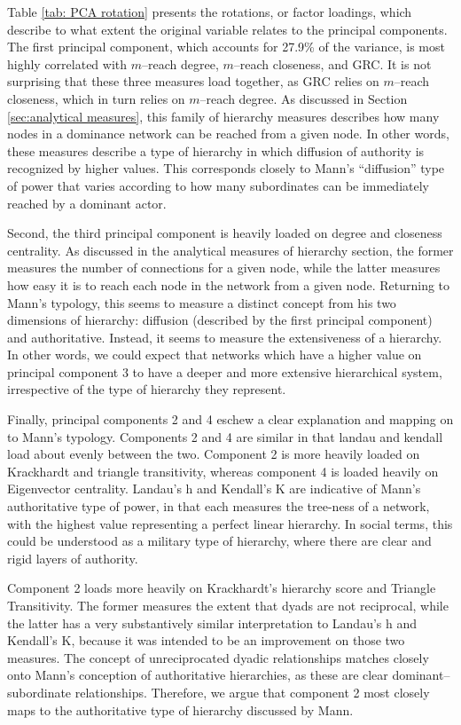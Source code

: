 \documentclass[3p,times]{elsarticle}
\begin{document}
Table \ref{tab: PCA rotation} presents the rotations, or factor loadings, which describe to what extent the original variable relates to the principal components. The first principal component, which accounts for 27.9\% of the variance, is most highly correlated with $m$--reach degree, $m$--reach closeness, and GRC. It is not surprising that these three measures load together, as GRC relies on $m$--reach closeness, which in turn relies on $m$--reach degree. As discussed in Section \ref{sec:analytical measures}, this family of hierarchy measures describes how many nodes in a dominance network can be reached from a given node. In other words, these measures describe a type of hierarchy in which diffusion of authority is recognized by higher values. This corresponds closely to Mann's ``diffusion'' type of power that varies according to how many subordinates can be immediately reached by a dominant actor.

Second, the third principal component is heavily loaded on degree and closeness centrality. As discussed in the analytical measures of hierarchy section, the former measures the number of connections for a given node, while the latter measures how easy it is to reach each node in the network from a given node. Returning to Mann's typology, this seems to measure a distinct concept from his two dimensions of hierarchy: diffusion (described by the first principal component) and authoritative. Instead, it seems to measure the extensiveness of a hierarchy. In other words, we could expect that networks which have a higher value on principal component 3 to have a deeper and more extensive hierarchical system, irrespective of the type of hierarchy they represent.

Finally, principal components 2 and 4 eschew a clear explanation and mapping on to Mann's typology. Components 2 and 4 are similar in that landau and kendall load about evenly between the two. Component 2 is more heavily loaded on Krackhardt and triangle transitivity, whereas component 4 is loaded heavily on Eigenvector centrality. Landau's h and Kendall's K are indicative of Mann's authoritative type of power, in that each measures the tree-ness of a network, with the highest value representing a perfect linear hierarchy. In social terms, this could be understood as a military type of hierarchy, where there are clear and rigid layers of authority. 

Component 2 loads more heavily on Krackhardt's hierarchy score and Triangle Transitivity. The former measures the extent that dyads are not reciprocal, while the latter has a very substantively similar interpretation to Landau's h and Kendall's K, because it was intended to be an improvement on those two measures. The concept of unreciprocated dyadic relationships matches closely onto Mann's conception of authoritative hierarchies, as these are clear dominant--subordinate relationships. Therefore, we argue that component 2 most closely maps to the authoritative type of hierarchy discussed by Mann.
\end{document}
